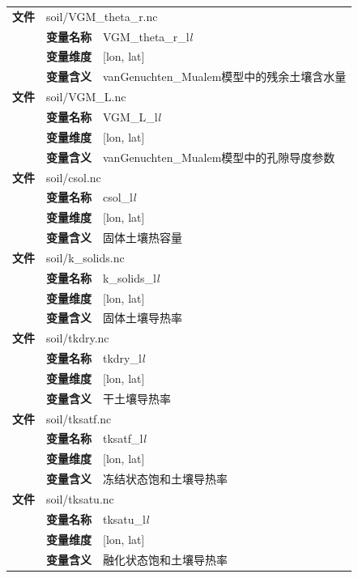 \documentclass[a4paper,12pt,twoside]{article}
\begin{document}
{\begin{longtable}{llp{}}
\cline{1-3}
\textbf{文件} & \multicolumn{2}{l}{soil/VGM\_theta\_r.nc} \\
\cline{2-3}
& \textbf{变量名称} &  VGM\_theta\_r\_l\textit{l} \\
& \textbf{变量维度} & {[}lon, lat{]} \\
& \textbf{变量含义} & vanGenuchten\_Mualem模型中的残余土壤含水量 \\
\cline{1-3}
\textbf{文件} & \multicolumn{2}{l}{soil/VGM\_L.nc} \\
\cline{2-3}
& \textbf{变量名称} &  VGM\_L\_l\textit{l} \\
& \textbf{变量维度} & {[}lon, lat{]} \\
& \textbf{变量含义} & vanGenuchten\_Mualem模型中的孔隙导度参数\\
\cline{1-3}
\textbf{文件} & \multicolumn{2}{l}{soil/csol.nc} \\
\cline{2-3}
& \textbf{变量名称} & csol\_l\textit{l} \\
& \textbf{变量维度} & {[}lon, lat{]} \\
& \textbf{变量含义} & 固体土壤热容量 \\
\cline{1-3}
\textbf{文件} & \multicolumn{2}{l}{soil/k\_solids.nc} \\
\cline{2-3}
& \textbf{变量名称} & k\_solids\_l\textit{l} \\
& \textbf{变量维度} & {[}lon, lat{]} \\
& \textbf{变量含义} & 固体土壤导热率 \\
\cline{1-3}
\textbf{文件} & \multicolumn{2}{l}{soil/tkdry.nc} \\
\cline{2-3}
& \textbf{变量名称} & tkdry\_l\textit{l} \\
& \textbf{变量维度} & {[}lon, lat{]} \\
& \textbf{变量含义} & 干土壤导热率 \\
\cline{1-3}
\textbf{文件} & \multicolumn{2}{l}{soil/tksatf.nc} \\
\cline{2-3}
& \textbf{变量名称} &  tksatf\_l\textit{l} \\
& \textbf{变量维度} & {[}lon, lat{]} \\
& \textbf{变量含义} & 冻结状态饱和土壤导热率\\
\cline{1-3}
\textbf{文件} & \multicolumn{2}{l}{soil/tksatu.nc} \\
\cline{2-3}
& \textbf{变量名称} & tksatu\_l\textit{l} \\
& \textbf{变量维度} & {[}lon, lat{]} \\
& \textbf{变量含义} & 融化状态饱和土壤导热率 \\


\end{longtable}}
\end{document}
